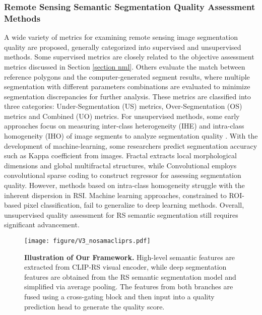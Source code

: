 \subsubsection{Remote Sensing Semantic Segmentation Quality Assessment Methods}\label{section rsml}
A wide variety of metrics for examining remote sensing image segmentation quality are proposed, generally categorized into supervised and unsupervised methods. Some supervised metrics are closely related to the objective assessment metrics discussed in Section \ref{section nml}. Others\cite{ZHANG201573,article222,LIU2012144,SU2017256,article,YANG2015186} evaluate the match between reference polygons and the computer-generated segment results, where multiple segmentation with different parameters combinations are evaluated to minimize segmentation discrepancies for further analysis. These metrics are classified into three categories: Under-Segmentation (US) metrics, Over-Segmentation (OS) metrics and Combined (UO) metrics. For unsupervised methods, some early approaches focus on measuring inter-class heterogeneity (IHE) and intra-class homogeneity (IHO) of image segments to analyze segmentation quality \cite{article31666, WOODCOCK1987311, articleroclv, Zhihua}. 
With the development of machine-learning, some researchers predict segmentation accuracy such as Kappa coefficient\cite{xia2015quality} from images. Fractal \cite{chen2019effects} extracts local morphological dimensions and global multifractal structures, while Convolutional \cite{wei2021effects} employs convolutional sparse coding to construct regressor for assessing segmentation quality. However, methods based on intra-class homogeneity struggle with the inherent dispersion in RSI. Machine learning approaches, constrained to ROI-based pixel classification, fail to generalize to deep learning methods. Overall, unsupervised quality assessment for RS semantic segmentation still requires significant advancement.
\begin{figure*}
\centering %
\texttt{[image: figure/V3\_nosamacliprs.pdf]}

\caption{ \textbf{Illustration of Our Framework.} High-level semantic features are extracted from CLIP-RS visual encoder, while deep segmentation features are obtained from the RS semantic segmentation model and simplified via average pooling. The features from both branches are fused using a cross-gating block and then input into a quality prediction head to generate the quality score.}
\label{figure1}
\end{figure*}